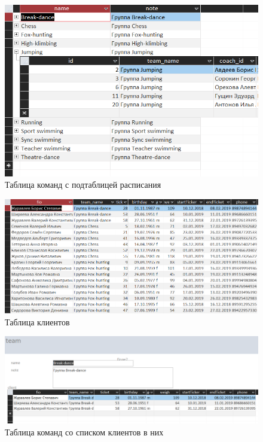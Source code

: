 \documentclass[a4paper,14pt]{article}
\begin{document}
	 \begin{figure}[H]
		\centering		
		\includegraphics[width=\linewidth]{image/5_team}
		\caption{Таблица команд с подтаблицей расписания}\label{img:5_team}
	\end{figure}
	
	\begin{figure}[H]
		\centering		
		\includegraphics[width=\linewidth]{image/5_client}
		\caption{Таблица клиентов}\label{img:5_client}
	\end{figure}	
	 \begin{figure}[H]
		\centering		
		\includegraphics[width=\linewidth]{image/5_team_client}
		\caption{Таблица команд со списком клиентов в них}\label{img:5_team_client}
	\end{figure}
	
\end{document}
